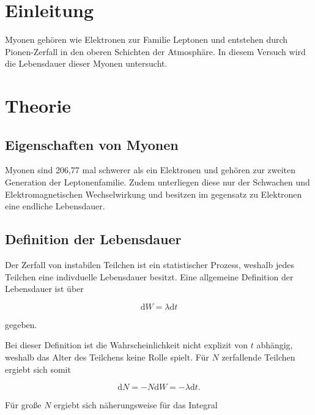 \section{Einleitung} %
\label{sec:einleitung}

Myonen gehören wie Elektronen zur Familie Leptonen und entstehen durch Pionen-Zerfall in den oberen Schichten der Atmosphäre.
In diesem Versuch wird die Lebensdauer dieser Myonen untersucht.

\section{Theorie} %
\label{sec:theorie}

\subsection{Eigenschaften von Myonen} %
\label{sub:eigenschaften_von_myonen}


Myonen sind 206,77 mal schwerer als ein Elektronen und gehören zur zweiten Generation der Leptonenfamilie.
Zudem unterliegen diese nur der Schwachen und Elektromagnetischen Wechselwirkung und besitzen im gegensatz zu Elektronen eine endliche Lebensdauer.

\subsection{Definition der Lebensdauer} %
\label{sub:definition_der_lebensdauer}

Der Zerfall von instabilen Teilchen ist ein statistischer Prozess, weshalb jedes Teilchen eine indivduelle Lebensdauer besitzt.
Eine allgemeine Definition der Lebensdauer ist über 

\begin{equation}
	\text{d}W = \lambda \text{d}t
\end{equation}

gegeben.

Bei dieser Definition ist die Wahrscheinlichkeit nicht explizit von $t$ abhängig, weshalb das Alter des Teilchens keine Rolle spielt.
Für $N$ zerfallende Teilchen ergiebt sich somit 

\begin{equation}
	\text{d}N = -N \text{d}W = -\lambda \text{d}t.
\end{equation}

Für große $N$ ergiebt sich näherungsweise für das Integral

